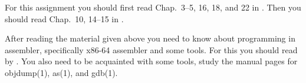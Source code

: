 For this assignment you should first read
Chap.~3--5, 16, 18, and 22 in  
\cite{Anderson2008sea}.
Then you should read Chap.~10, 14--15 in  
\cite{Gollmann2011cs}.

After reading the material given above you need to know about programming in 
assembler, specifically x86-64 assembler and some tools.
For this you should read  by \citet{assembly}.
You also need to be acquainted with some tools, study the manual pages for 
objdump(1), as(1), and gdb(1).
